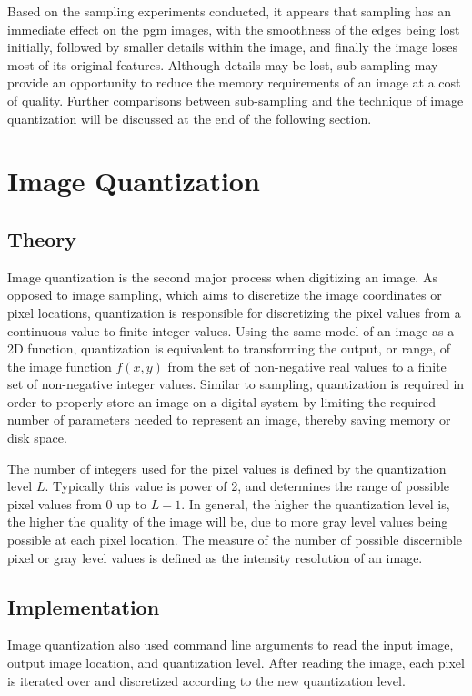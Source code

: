 \documentclass[headings=optiontoheadandtoc,listof=totoc,parskip=full]{scrartcl}
\begin{document}
Based on the sampling experiments conducted, it appears that sampling has an immediate effect on the pgm images, with the smoothness of the edges being lost initially, followed by smaller details within the image, and finally the image loses most of its original features. Although details may be lost, sub-sampling may provide an opportunity to reduce the memory requirements of an image at a cost of quality. Further comparisons between sub-sampling and the technique of image quantization will be discussed at the end of the following section.

\section{Image Quantization}
\label{sec:quantization}

\subsection{Theory}
Image quantization is the second major process when digitizing an image. As opposed to image sampling, which aims to discretize the image coordinates or pixel locations, quantization is responsible for discretizing the pixel values from a continuous value to finite integer values. Using the same model of an image as a 2D function, quantization is equivalent to transforming the output, or range, of the image function $f(x,y)$ from the set of non-negative real values to a finite set of non-negative integer values. Similar to sampling, quantization is required in order to properly store an image on a digital system by limiting the required number of parameters needed to represent an image, thereby saving memory or disk space.

The number of integers used for the pixel values is defined by the quantization level $L$. Typically this value is power of 2, and determines the range of possible pixel values from 0 up to $L-1$. In general, the higher the quantization level is, the higher the quality of the image will be, due to more gray level values being possible at each pixel location. The measure of the number of possible discernible pixel or gray level values is defined as the intensity resolution of an image.

\subsection{Implementation}

Image quantization also used command line arguments to read the input image, output image location, and quantization level. After reading the image, each pixel is iterated over and discretized according to the new quantization level. 
\end{document}
